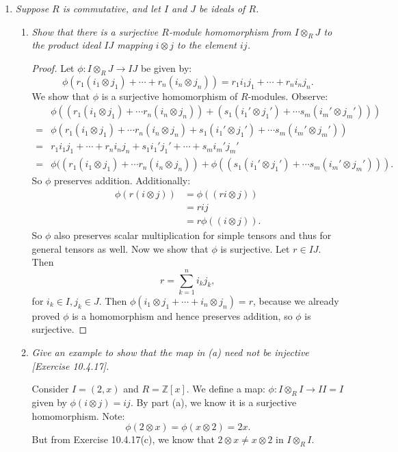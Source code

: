 \documentclass[10pt,oneside,reqno]{amsart}
\theoremstyle{plain}
\theoremstyle{definition}
\theoremstyle{remark}
\newcommand{\z}{\mathbb{Z}}
\newcommand{\bee}{\begin{equation}\begin{aligned}}
\newcommand{\eee}{\end{aligned}\end{equation}}
\newcommand{\tens}{\otimes}
\begin{document}
\begin{enumerate}[label=\arabic*.]
\item \textit{Suppose $R$ is commutative, and let $I$ and $J$ be ideals of $R$. }

\begin{enumerate}
\item \textit{Show that there is a surjective $R$-module homomorphism from $I \tens_R J$ to the product ideal $IJ$ mapping $i \tens j$ to the element $ij$. }

\begin{proof}
Let $\phi:I \tens_R J \to IJ$ be given by:
 $$
 \phi(r_1(i_1 \tens j_1) + \cdots + r_n(i_n \tens j_n)) = r_1i_1j_1 + \cdots + r_ni_nj_n.
 $$
  We show that $\phi$ is a surjective homomorphism of $R$-modules. Observe:
\bee
&\phi((r_1(i_1 \tens j_1) + \cdots r_n(i_n \tens j_n)) + (s_1(i_1' \tens j_1') + \cdots s_m(i_m' \tens j_m')))\\
= &\phi(r_1(i_1 \tens j_1) + \cdots r_n(i_n \tens j_n)+ s_1(i_1' \tens j_1') + \cdots s_m(i_m' \tens j_m'))\\
 = &r_1i_1j_1 + \cdots + r_ni_nj_n + s_1i_1'j_1' + \cdots + s_mi_m'j_m'\\
= &\phi((r_1(i_1 \tens j_1) + \cdots r_n(i_n \tens j_n)) + \phi((s_1(i_1' \tens j_1') + \cdots s_m(i_m' \tens j_m'))).
\eee
So $\phi$ preserves addition. Additionally:
\bee
\phi(r(i \tens j)) 
&= \phi((ri \tens j))\\
&= rij\\
&= r\phi((i \tens j)).
\eee
So $\phi$ also preserves scalar multiplication for simple tensors and thus for general tensors as well. Now we show that $\phi$ is surjective. Let $r \in IJ$. Then 
$$
r = \sum_{k = 1}^n i_kj_k,
$$ 
for $i_k \in I,j_k \in J$. Then $\phi(i_1 \tens j_1 + \cdots + i_n \tens j_n) = r$, because we already proved $\phi$ is a homomorphism and hence preserves addition, so $\phi$ is surjective. 
\end{proof}

\item \textit{Give an example to show that the map in (a) need not be injective [Exercise 10.4.17]. }


Consider $I = (2,x)$ and $R = \z[x]$. We define a map: $\phi:I \tens_R I \to II = I$ given by $\phi(i \tens j) = ij$. By part (a), we know it is a surjective homomorphism. Note:
$$
\phi(2 \tens x) = \phi(x \tens 2) = 2x.
$$
But from Exercise 10.4.17(c), we know that $2 \tens x \neq x \tens 2$ in $I \tens_R I$. 

\end{enumerate}

\end{enumerate}
\end{document}
